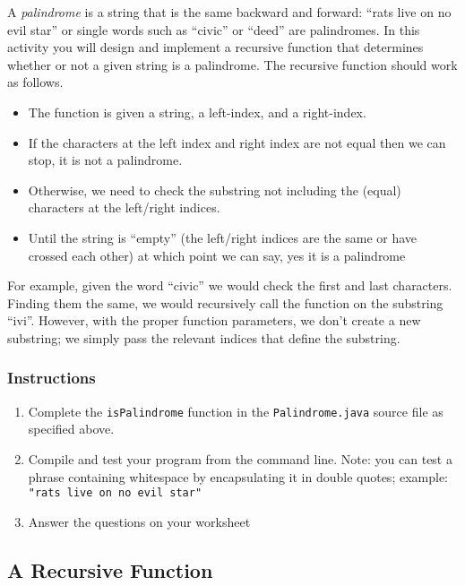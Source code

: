 \documentclass[12pt]{scrartcl}
\begin{document}
A \emph{palindrome} is a string that is the same backward and 
forward: ``rats live on no evil star'' or single words such as ``civic'' 
or ``deed'' are palindromes.  In this activity you will design and 
implement a recursive function that determines whether or not 
a given string is a palindrome.  The recursive function should 
work as follows.  
\begin{itemize}
  \item The function is given a string, a left-index, and a right-index.
  \item If the characters at the left index and right index are not 
	equal then we can stop, it is not a palindrome.
  \item Otherwise, we need to check the substring not including the 
	(equal) characters at the left/right indices.
  \item Until the string is ``empty'' (the left/right indices are the same 
	or have crossed each other) at which point we can say, yes it 
	is a palindrome
\end{itemize}

For example, given the word ``civic'' we would check the first and 
last characters.  Finding them the same, we would recursively call 
the function on the substring ``ivi''.  However, with the proper function 
parameters, we don't create a new substring; we simply pass the 
relevant indices that define the substring.

\subsubsection*{Instructions}

\begin{enumerate}
  \item Complete the \texttt{isPalindrome} function in the 
	\texttt{Palindrome.java} source file as specified above.
  \item Compile and test your program from the command line.  
	Note: you can test a phrase containing whitespace by encapsulating 
	it in double quotes; example: \\
	\texttt{"rats live on no evil star"}
  \item Answer the questions on your worksheet
\end{enumerate}
	
\subsection{A Recursive Function}
\end{document}
